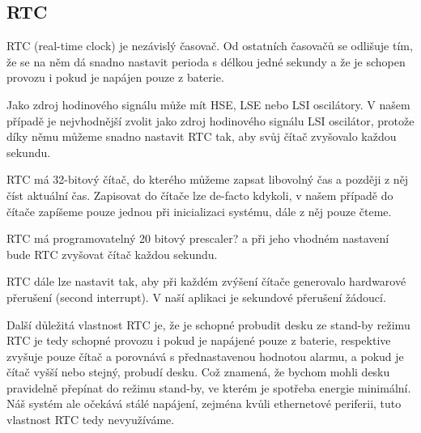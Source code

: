 \subsection{RTC}
RTC (real-time clock) je nezávislý časovač.
Od ostatních časovačů se odlišuje tím, že se na něm dá snadno nastavit perioda
s délkou jedné sekundy a že je schopen provozu i pokud je napájen pouze z
baterie.

Jako zdroj hodinového signálu může mít HSE, LSE nebo LSI oscilátory.
V našem případě je nejvhodnější zvolit jako zdroj hodinového signálu LSI oscilátor,
protože díky němu můžeme snadno nastavit RTC tak, aby svůj čítač zvyšovalo
každou sekundu.

RTC má 32-bitový čítač, do kterého můžeme zapsat libovolný čas a později z
něj číst aktuální čas.
Zapisovat do čítače lze de-facto kdykoli, v našem případě do čítače zapíšeme
pouze jednou při inicializaci systému, dále z něj pouze čteme.

RTC má programovatelný 20 bitový prescaler? a při jeho vhodném nastavení bude
RTC zvyšovat čítač každou sekundu.

RTC dále lze nastavit tak, aby při každém zvýšení čítače generovalo hardwarové
přerušení (second interrupt).
V naší aplikaci je sekundové přerušení žádoucí.

Další důležitá vlastnost RTC je, že je schopné probudit desku ze stand-by režimu
RTC je tedy schopné provozu i pokud je napájené pouze z baterie, respektive
zvyšuje pouze čítač a porovnává s přednastavenou hodnotou alarmu, a pokud je
čítač vyšší nebo stejný, probudí desku.
Což znamená, že bychom mohli desku pravidelně přepínat do režimu stand-by, ve
kterém je spotřeba energie minimální.
Náš systém ale očekává stálé napájení, zejména kvůli ethernetové periferii,
tuto vlastnost RTC tedy nevyužíváme.
